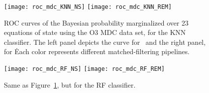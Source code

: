 
\begin{figure}%
\texttt{[image: roc\_mdc\_KNN\_NS]}
\texttt{[image: roc\_mdc\_KNN\_REM]}
\caption{ROC curves of the Bayesian probability marginalized
    over 23 equations of state using the O3 MDC data set, for the \ac{KNN} classifier. The left panel depicts the curve for \hasns\, and the right panel, for \hasrem\. Each color represents different matched-filtering pipelines.}
\label{fig:rocMDC_KNN}
\end{figure}

\begin{figure}%
\texttt{[image: roc\_mdc\_RF\_NS]}
\texttt{[image: roc\_mdc\_RF\_REM]}
\caption{Same as Figure~\ref{fig:rocMDC_KNN}, but for the \ac{RF} classifier.}
\label{fig:rocMDC_RF}
\end{figure}

